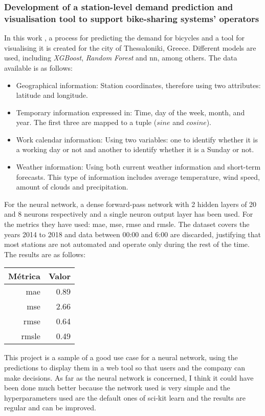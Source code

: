 \subsubsection{Development of a station-level demand prediction and visualisation tool to support bike-sharing systems’ operators}

In this work \cite{BOUFIDIS202051}, a process for predicting the demand for bicycles and a tool for visualising it is created for the city of Thessaloniki, Greece. Different models are used, including \textit{XGBoost}, \textit{Random Forest} and \acrlong{nn}, among others. The data available is as follows:

\begin{itemize}
    \item Geographical information: Station coordinates, therefore using two attributes: latitude and longitude.
    \item Temporary information expressed in: Time, day of the week, month, and year. The first three are mapped to a tuple ($sine$ and $cosine$).
    \item Work calendar information: Using two variables: one to identify whether it is a working day or not and another to identify whether it is a Sunday or not.
    \item Weather information: Using both current weather information and short-term forecasts. This type of information includes average temperature, wind speed, amount of clouds and precipitation.
\end{itemize}

For the neural network, a dense forward-pass network with 2 hidden layers of 20 and 8 neurons respectively and a single neuron output layer has been used. For the metrics they have used: \acrshort{mae}, \acrshort{mse}, \acrshort{rmse} and \acrshort{rmsle}. The dataset covers the years 2014 to 2018 and data between 00:00 and 6:00 are discarded, justifying that most stations are not automated and operate only during the rest of the time. The results are as follows:

 
\begin{table}[H]
\centering
\begin{tabular}{rr}
\toprule
 Métrica & Valor \\
\midrule
 \acrshort{mae} &  0.89 \\
 \acrshort{mse} &  2.66 \\
 \acrshort{rmse} &  0.64 \\
 \acrshort{rmsle} &  0.49 \\
\bottomrule
\end{tabular}
\end{table}


This project is a sample of a good use case for a neural network, using the predictions to display them in a web tool so that users and the company can make decisions. As far as the neural network is concerned, I think it could have been done much better because the network used is very simple and the hyperparameters used are the default ones of sci-kit learn and the results are regular and can be improved.